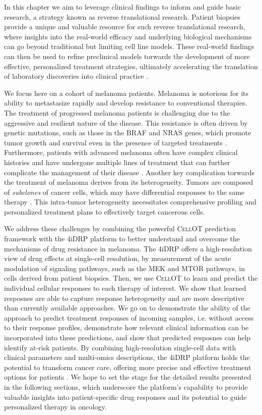 In this chapter
we aim to leverage clinical findings to inform and guide basic research, a strategy known as reverse translational research.
Patient biopsies provide a unique and valuable resource for such reverse translational research,
where insights into the real-world efficacy and underlying biological mechanisms can go beyond traditional but limiting cell line models.
These real-world findings can then be used to refine preclinical models torwards the development of more effective, personalized treatment strategies, ultimately accelerating the translation of laboratory discoveries into clinical practice \cite{}.

We focus here on a cohort of melanoma patients.
Melanoma is notorious for its ability to metastasize rapidly and develop resistance to conventional therapies.
The treatment of progressed melanoma patients is challenging due to the aggressive and resilient nature of the disease.
This resistance is often driven by genetic mutations, such as those in the BRAF and NRAS genes, which promote tumor growth and survival even in the presence of targeted treatments \cite{}.
Furthermore, patients with advanced melanoma often have complex clinical histories and have undergone multiple lines of treatment that can further complicate the management of their disease \cite{}.
Another key complication torwards the treatment of melanoma derives from its heterogeneity.
Tumors are composed of \emph{subclones} of cancer cells, which may have differential responses to the same therapy \cite{}.
This intra-tumor heterogeneity necessitates comprehensive profiling and personalized treatment plans to effectively target cancerous cells.

We address these challenges by combining
the powerful \textsc{CellOT} prediction framework with the 4iDRP platform
to better understand and overcome the mechanisms of drug resistance in melanoma.
The 4iDRP offers a high-resolution view of drug effects at single-cell resolution, by measurement of the acute modulation of signaling pathways, such as the MEK and MTOR pathways, in cells derived from patient biopsies.
Then, we use \textsc{CellOT} to learn and predict the individual cellular responses to each therapy of interest.
We show that learned resposnes are able to capture response heterogeneity and are more descriptive than currently available approaches.
We go on to demonstrate the ability of the approach to predict treatment responses of incoming samples, i.e. without access to their response profiles,
demonstrate how relevant clinical information can be incorporated into these predictions,
and show that predicted resposnes can help identify at-risk patients.
By combining high-resolution single-cell data with clinical parameters and multi-omics descriptions, the 4iDRP platform holds the potential to transform cancer care, offering more precise and effective treatment options for patients \cite{}.
We hope to set the stage for the detailed results presented in the following sections, which underscore the platform's capability to provide valuable insights into patient-specific drug responses and its potential to guide personalized therapy in oncology.
